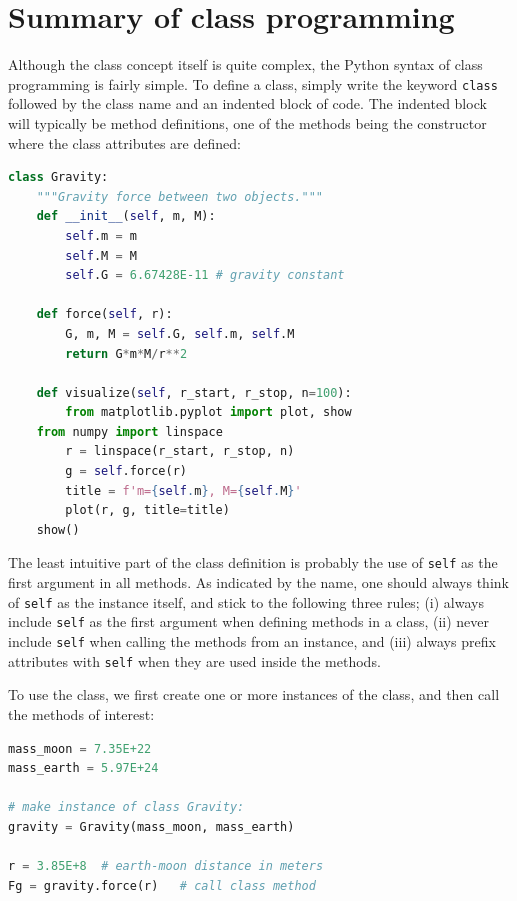 \documentclass[graybox,envcountchap,sectrefs,final]{svmonodo}
\begin{document}
\section{Summary of class programming}
Although the class concept itself is quite complex, the Python syntax of class programming is fairly
simple. To define a class, simply write the keyword \texttt{class} followed by the
class name and an indented block of code. The indented block will typically be method
definitions, one of the methods being the constructor where the class attributes are defined:
\begin{lstlisting}[language=Python,style=blue1]
class Gravity:
    """Gravity force between two objects."""
    def __init__(self, m, M):
        self.m = m
        self.M = M
        self.G = 6.67428E-11 # gravity constant

    def force(self, r):
        G, m, M = self.G, self.m, self.M
        return G*m*M/r**2

    def visualize(self, r_start, r_stop, n=100):
        from matplotlib.pyplot import plot, show
	from numpy import linspace
        r = linspace(r_start, r_stop, n)
        g = self.force(r)
        title = f'm={self.m}, M={self.M}'
        plot(r, g, title=title)
	show()
\end{lstlisting}
The least intuitive part of the class definition is probably the use of \texttt{self} as the first argument
in all methods. As indicated by the name, one should always think of \texttt{self} as the instance itself,
and stick to the following three rules; (i) always include \texttt{self} as the first argument when defining
methods in a class, (ii) never include \texttt{self} when calling the methods from an instance, and (iii)
always prefix attributes with \texttt{self} when they are used inside the methods.

To use the class, we first create one or more instances of the class, and then call the methods
of interest:
\begin{lstlisting}[language=Python,style=blue1]
mass_moon = 7.35E+22
mass_earth = 5.97E+24

# make instance of class Gravity:
gravity = Gravity(mass_moon, mass_earth)

r = 3.85E+8  # earth-moon distance in meters
Fg = gravity.force(r)   # call class method
\end{lstlisting}
\end{document}
